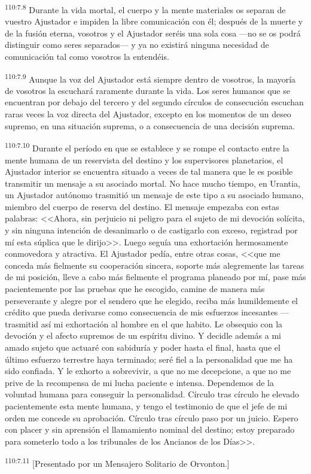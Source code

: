 \par
\textsuperscript{110:7.8} Durante la vida mortal, el cuerpo y la mente materiales os separan de vuestro Ajustador e impiden la libre comunicación con él; después de la muerte y de la fusión eterna, vosotros y el Ajustador seréis una sola cosa ---no se os podrá distinguir como seres separados--- y ya no existirá ninguna necesidad de comunicación tal como vosotros la entendéis.

\par
\textsuperscript{110:7.9} Aunque la voz del Ajustador está siempre dentro de vosotros, la mayoría de vosotros la escuchará raramente durante la vida. Los seres humanos que se encuentran por debajo del tercero y del segundo círculos de consecución escuchan raras veces la voz directa del Ajustador, excepto en los momentos de un deseo supremo, en una situación suprema, o a consecuencia de una decisión suprema.

\par
\textsuperscript{110:7.10} Durante el período en que se establece y se rompe el contacto entre la mente humana de un reservista del destino y los supervisores planetarios, el Ajustador interior se encuentra situado a veces de tal manera que le es posible transmitir un mensaje a su asociado mortal. No hace mucho tiempo, en Urantia, un Ajustador autónomo trasmitió un mensaje de este tipo a su asociado humano, miembro del cuerpo de reserva del destino. El mensaje empezaba con estas palabras: <<Ahora, sin perjuicio ni peligro para el sujeto de mi devoción solícita, y sin ninguna intención de desanimarlo o de castigarlo con exceso, registrad por mí esta súplica que le dirijo>>. Luego seguía una exhortación hermosamente conmovedora y atractiva. El Ajustador pedía, entre otras cosas, <<que me conceda más fielmente su cooperación sincera, soporte más alegremente las tareas de mi posición, lleve a cabo más fielmente el programa planeado por mí, pase más pacientemente por las pruebas que he escogido, camine de manera más perseverante y alegre por el sendero que he elegido, reciba más humildemente el crédito que pueda derivarse como consecuencia de mis esfuerzos incesantes ---trasmitid así mi exhortación al hombre en el que habito. Le obsequio con la devoción y el afecto supremos de un espíritu divino. Y decidle además a mi amado sujeto que actuaré con sabiduría y poder hasta el final, hasta que el último esfuerzo terrestre haya terminado; seré fiel a la personalidad que me ha sido confiada. Y le exhorto a sobrevivir, a que no me decepcione, a que no me prive de la recompensa de mi lucha paciente e intensa. Dependemos de la voluntad humana para conseguir la personalidad. Círculo tras círculo he elevado pacientemente esta mente humana, y tengo el testimonio de que el jefe de mi orden me concede su aprobación. Círculo tras círculo paso por un juicio. Espero con placer y sin aprensión el llamamiento nominal del destino; estoy preparado para someterlo todo a los tribunales de los Ancianos de los Días>>.

\par
\textsuperscript{110:7.11} [Presentado por un Mensajero Solitario de Orvonton.]